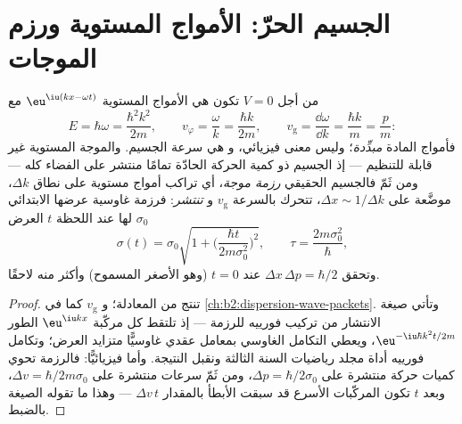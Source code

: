 \section{الجسيم الحرّ: الأمواج المستوية ورزم الموجات}

\begin{proposition}\label{prop:b2:schrodinger-wave-functions:free}
من أجل $V = 0$ تكون  هي الأمواج المستوية $\eu^{\iu(kx -
\omega t)}$ مع
\[
E = \hbar\omega = \frac{\hbar^2k^2}{2m}, \qquad
v_\varphi = \frac{\omega}{k} = \frac{\hbar k}{2m}, \qquad
v_{\text{g}} = \frac{\dd\omega}{\dd k} = \frac{\hbar k}{m} = \frac{p}{m} :
\]
فأمواج المادة \emph{مبدِّدة}؛ وليس  معنى
فيزيائي، و\emph{} هي سرعة الجسيم. والموجة المستوية
غير قابلة للتنظيم --- إذ الجسيم ذو كمية الحركة الحادّة تمامًا
منتشر على الفضاء كله --- ومن ثَمّ فالجسيم الحقيقي \emph{رزمة
موجة}، أي تراكب أمواج مستوية على نطاق
$\Delta k$، موضَّعة على $\Delta x \sim 1/\Delta k$، تتحرك بالسرعة $v_{\text{g}}$ و
\emph{تنتشر}: فرزمة غاوسية عرضها الابتدائي $\sigma_0$ لها عند
اللحظة $t$ العرض
\[
\sigma(t) = \sigma_0\sqrt{1 + \Big(\frac{\hbar t}{2m\sigma_0^2}\Big)^2}, \qquad
\tau = \frac{2m\sigma_0^2}{\hbar} ,
\]
وتحقق $\Delta x\,\Delta p = \hbar/2$ عند $t = 0$ (وهو الأصغر المسموح)
وأكثر منه لاحقًا.
\end{proposition}

\begin{proof}
تنتج  من المعادلة؛ و $v_{\text{g}}$ كما في
\cref{ch:b2:dispersion-wave-packets}. وتأتي صيغة الانتشار من
تركيب فورييه للرزمة --- إذ تلتقط كل مركّبة $\eu^{\iu kx}$
الطور $\eu^{-\iu\hbar k^2t/2m}$، ويعطي التكامل الغاوسي بمعامل
عقدي غاوسيًّا متزايد العرض؛ وتكامل فورييه أداة
مجلد رياضيات السنة الثالثة ونقبل
النتيجة. وأما فيزيائيًّا: فالرزمة تحوي كميات حركة منتشرة على $\Delta p
= \hbar/2\sigma_0$، ومن ثَمّ سرعات منتشرة على $\Delta v = \hbar/2m\sigma_0$،
وبعد $t$ تكون المركّبات الأسرع قد سبقت الأبطأ بالمقدار $\Delta v\,t$
--- وهذا ما تقوله الصيغة بالضبط.
\end{proof}

